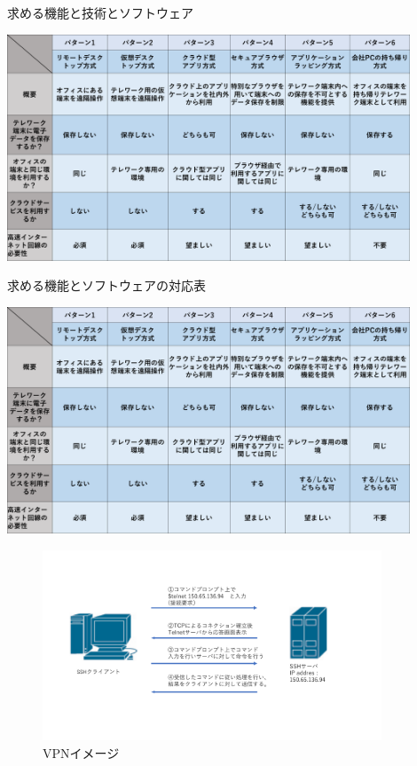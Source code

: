 \documentclass[11pt,a4j,titlepage]{jreport}
\begin{document}
\begin{table}[tbp]
    \caption{求める機能と技術とソフトウェア}
    \centering
    \includegraphics*[width=0.9\textwidth,page=8]{graphs/telework_list.pdf}
    \label{spec_and_technic}
\end{table}
\begin{table}[tbp]
    \caption{求める機能とソフトウェアの対応表}
    \centering
    \includegraphics*[width=0.9\textwidth,page=9]{graphs/telework_list.pdf}
    \label{software}
\end{table}

\begin{figure}[tbp]
    \centering
    \includegraphics*[width=0.9\textwidth,page=20]{graphs/network_archtecture.pdf}
    \caption{VPNイメージ}
    \label{VPN_image}
\end{figure}
\end{document}
